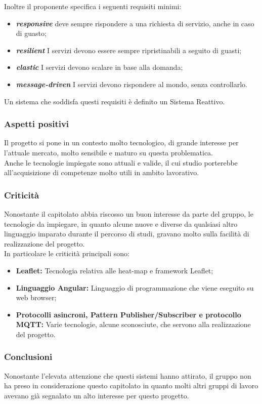 Inoltre il proponente specifica i seguenti requisiti minimi:
\begin{itemize}
	\item \textbf{\textit{responsive}} deve sempre rispondere a una richiesta di servizio, anche in caso di guasto;
	\item \textbf{\textit{resilient}} I servizi devono essere sempre ripristinabili a seguito di guasti;
	\item \textbf{\textit{elastic}} I servizi devono scalare in base alla domanda;
	\item \textbf{\textit{message-driven}} I servizi devono rispondere al mondo, senza controllarlo.
\end{itemize}
Un sistema che soddisfa questi requisiti è definito un Sistema Reattivo.


\subsubsection{Aspetti positivi}

Il progetto si pone in un contesto molto tecnologico, di grande interesse per l'attuale mercato, molto sensibile e maturo su questa problematica.\\
Anche le tecnologie impiegate sono attuali e valide, il cui studio porterebbe all'acquisizione di competenze molto utili in ambito lavorativo.



\subsubsection{Criticità}

Nonostante il capitolato abbia riscosso un buon interesse da parte del gruppo, le tecnologie da impiegare, in quanto alcune nuove e diverse da qualsiasi altro linguaggio imparato durante il percorso di studi, gravano molto sulla facilità di realizzazione del progetto.\\
In particolare le criticità principali sono:
\begin{itemize}
    \item \textbf{Leaflet:} Tecnologia relativa alle heat-map e framework Leaflet;
    \item \textbf{Linguaggio Angular:} Linguaggio di programmazione che viene eseguito su web browser;
    \item \textbf{Protocolli asincroni, Pattern Publisher/Subscriber e protocollo MQTT: } Varie tecnologie, alcune sconosciute, che servono alla realizzazione del progetto.
\end{itemize}


\subsubsection{Conclusioni}

Nonostante l'elevata attenzione che questi sistemi hanno attirato, il gruppo non ha preso in considerazione questo capitolato in quanto molti altri gruppi di lavoro avevano già segnalato un alto interesse per questo progetto. \\
